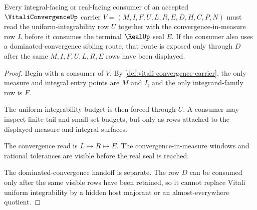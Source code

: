 \begin{theorem}
\label{thm:vitali-convergence-uniform-integrability-handoff}
Every integral-facing or real-facing consumer of an accepted $\VitaliConvergenceUp$ carrier $V=(M,I,F,U,L,R,E,D,H,C,P,N)$ must read the uniform-integrability row $U$ together with the convergence-in-measure row $L$ before it consumes the terminal $\RealUp$ seal $E$. If the consumer also uses a dominated-convergence sibling route, that route is exposed only through $D$ after the same $M,I,F,U,L,R,E$ rows have been displayed.
\end{theorem}
\begin{proof}
Begin with a consumer of $V$. By \autoref{def:vitali-convergence-carrier}, the only measure and integral entry points are $M$ and $I$, and the only integrand-family row is $F$.

The uniform-integrability budget is then forced through $U$. A consumer may inspect finite tail and small-set budgets, but only as rows attached to the displayed measure and integral surfaces.

The convergence read is $L \longmapsto R \longmapsto E$. The convergence-in-measure windows and rational tolerances are visible before the real seal is reached.

The dominated-convergence handoff is separate. The row $D$ can be consumed only after the same visible rows have been retained, so it cannot replace Vitali uniform integrability by a hidden host majorant or an almost-everywhere quotient.
\end{proof}




